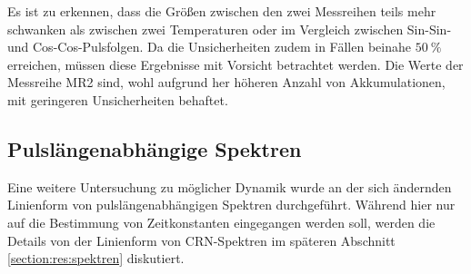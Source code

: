 Es ist zu erkennen, dass die Größen zwischen den zwei Messreihen teils mehr schwanken als zwischen zwei Temperaturen oder im Vergleich zwischen Sin-Sin- und Cos-Cos-Pulsfolgen. Da die Unsicherheiten zudem in Fällen beinahe $\SI{50}{\percent}$ erreichen, müssen diese Ergebnisse mit Vorsicht betrachtet werden. Die Werte der Messreihe MR2 sind, wohl aufgrund her höheren Anzahl von Akkumulationen, mit geringeren Unsicherheiten behaftet.



\subsection{Pulslängenabhängige Spektren} \label{section:res:spekdyn}

Eine weitere Untersuchung zu möglicher Dynamik wurde an der sich ändernden Linienform von pulslängenabhängigen Spektren durchgeführt. Während hier nur auf die Bestimmung von Zeitkonstanten eingegangen werden soll, werden die Details von der Linienform von CRN-Spektren im späteren Abschnitt \ref{section:res:spektren} diskutiert.

